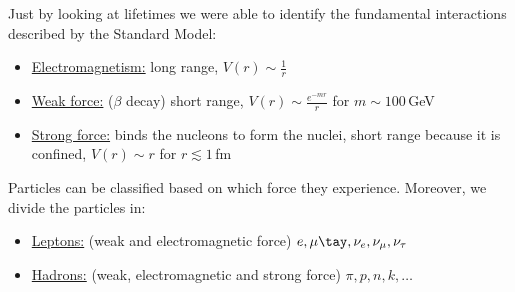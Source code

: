 \documentclass[../main.tex]{subfiles}
\begin{document}
Just by looking at lifetimes we were able to identify the fundamental interactions described by the Standard Model:
\begin{itemize}
    \item \underline{Electromagnetism:} long range, $V(r)\sim\frac{1}{r}$
    \item \underline{Weak force:} ($\beta$ decay) short range, $V(r)\sim \frac{e^{-mr}}{r}$ for $m\sim100$\,GeV
    \item \underline{Strong force:} binds the nucleons to form the nuclei, short range because it is confined, $V(r)\sim r$ for $r\lesssim1$\,fm
\end{itemize}
Particles can be classified based on which force they experience. Moreover, we divide the particles in:
\begin{itemize}
    \item \underline{Leptons:} (weak and electromagnetic force) $e,\mu\tay,\nu_e,\nu_\mu,\nu_\tau$
    \item \underline{Hadrons:} (weak, electromagnetic and strong force) $\pi,p,n,k,\dots$
\end{itemize}
\end{document}
